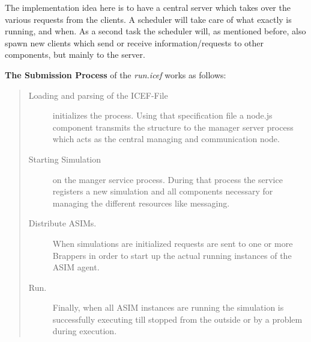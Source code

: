 The implementation idea here is to have a central server which takes over the various requests from the clients. A scheduler will take care of what exactly is running, and when. As a second task the scheduler will, as mentioned before, also spawn new clients which send or receive information/requests to other components, but mainly to the server.

\textbf{The Submission Process} of the \textit{run.icef} works as follows:

\begin{quote}
\small
\begin{description}
	\item [Loading and parsing of the ICEF-File] initializes the process. Using that specification file a node.js component transmits the structure to the manager server process which acts as the central managing and communication node.
	\item [Starting Simulation] on the manger service process. During that process the service registers a new simulation and all components necessary for managing the different resources like messaging.
	\item [Distribute ASIMs.] When simulations are initialized requests are sent to one or more Brappers in order to start up the actual running instances of the ASIM agent.
	\item [Run.] Finally, when all ASIM instances are running the simulation is successfully executing till stopped from the outside or by a problem during execution.
\end{description}
\end{quote}

